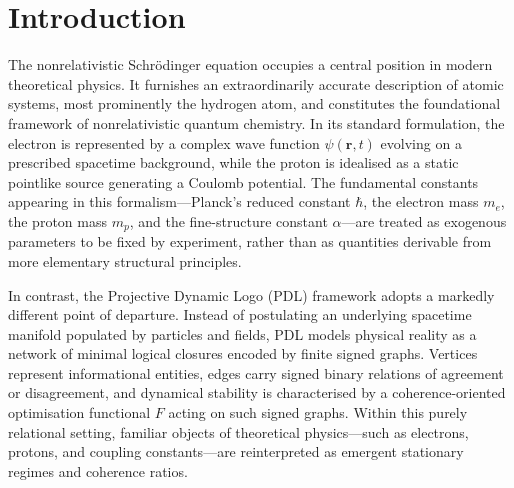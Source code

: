\documentclass[11pt,a4paper]{article}
\begin{document}
\section{Introduction}

The nonrelativistic Schr\"odinger equation occupies a central position in modern theoretical physics. It furnishes an extraordinarily accurate description of atomic systems, most prominently the hydrogen atom, and constitutes the foundational framework of nonrelativistic quantum chemistry. In its standard formulation, the electron is represented by a complex wave function $\psi(\mathbf{r},t)$ evolving on a prescribed spacetime background, while the proton is idealised as a static pointlike source generating a Coulomb potential. The fundamental constants appearing in this formalism—Planck’s reduced constant $\hbar$, the electron mass $m_e$, the proton mass $m_p$, and the fine-structure constant $\alpha$—are treated as exogenous parameters to be fixed by experiment, rather than as quantities derivable from more elementary structural principles.\par

In contrast, the Projective Dynamic Logo (PDL) framework adopts a markedly different point of departure. Instead of postulating an underlying spacetime manifold populated by particles and fields, PDL models physical reality as a network of minimal logical closures encoded by finite signed graphs.\cite{Laubscher2026IntroPDL,Laubscher2026PDL_English,Laubscher2026LDP_French} Vertices represent informational entities, edges carry signed binary relations of agreement or disagreement, and dynamical stability is characterised by a coherence-oriented optimisation functional $F$ acting on such signed graphs. Within this purely relational setting, familiar objects of theoretical physics—such as electrons, protons, and coupling constants—are reinterpreted as emergent stationary regimes and coherence ratios.\par
\end{document}
